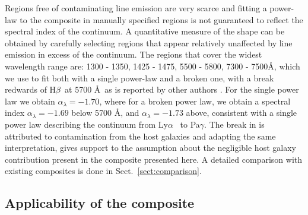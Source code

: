 \documentclass{aa}    %
\newcommand{\sectionname}{Sect.}
\newcommand{\Sect}[1]{\sectionname~\ref{sect:#1}}
\newcommand{\sect}[1]{\Sect{#1}}
\newcommand{\sectlabel}[1]{\label{sect:#1}}
\newcommand{\lya}{Ly$\alpha$}
\newcommand{\hb}{H$\beta$}
\begin{document}
Regions free of contaminating line emission are very scarce and fitting a
power-law to the composite in manually specified regions is not guaranteed to
reflect the spectral index of the continuum. A quantitative measure of the shape
can be obtained by carefully selecting regions that appear relatively unaffected
by line emission in excess of the continuum. The regions that cover the widest
wavelength range are: 1300 - 1350, 1425 - 1475, 5500 - 5800, 7300 - 7500\AA,
which we use to fit both with a single power-law and a broken one, with a
break redwards of \hb~at 5700 \AA~as is reported by other authors
\citep[e.g.,][]{VandenBerk2001}. For the single power law we obtain
$\alpha_\lambda = -1.70$, where for a broken power law, we obtain a spectral
index $\alpha_\lambda = -1.69$ below 5700 \AA, and $\alpha_\lambda = -1.73$
above, consistent with a single power law describing the continuum from \lya
~to Pa$\gamma$. The break in \cite{VandenBerk2001} is attributed to
contamination from the host galaxies \citep{Glikman2006} and adapting the same
interpretation, gives support to the assumption about the negligible host galaxy
contribution present in the composite presented here. A detailed comparison with
existing composites is done in \sect{comparison}.


\subsection{Applicability of the composite}  \sectlabel{application}
\end{document}
